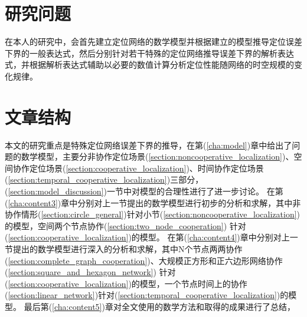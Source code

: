 \section{研究问题}
在本人的研究中，会首先建立定位网络的数学模型并根据建立的模型推导定位误差下界的一般表达式，然后分别针对若干特殊的定位网络推导误差下界的解析表达式，并根据解析表达式辅助以必要的数值计算分析定位性能随网络的时空规模的变化规律。

\section{文章结构}
本文的研究重点是特殊定位网络误差下界的推导，在第(\ref{cha:model})章中给出了问题的数学模型，主要分非协作定位场景(\ref{section:noncooperative_localization})、空间协作定位场景(\ref{section:cooperative_localization})、时间协作定位场景(\ref{section:temporal_cooperative_localization})三部分，(\ref{section:model_discussion})一节中对模型的合理性进行了进一步讨论。
在第(\ref{cha:content3})章中分别对上一节提出的数学模型进行初步的分析和求解，其中非协作情形(\ref{section:circle_general})针对小节(\ref{section:noncooperative_localization})的模型，空间两个节点协作(\ref{section:two_node_cooperation})
针对(\ref{section:cooperative_localization})的模型。
在第(\ref{cha:content4})章中分别对上一节提出的数学模型进行深入的分析和求解，其中N个节点两两协作(\ref{section:complete_graph_cooperation})、大规模正方形和正六边形网络协作(\ref{section:square_and_hexagon_network})
针对(\ref{section:cooperative_localization})的模型，一个节点时间上的协作(\ref{section:linear_network})针对(\ref{section:temporal_cooperative_localization})的模型。
最后第(\ref{cha:content5})章对全文使用的数学方法和取得的成果进行了总结，